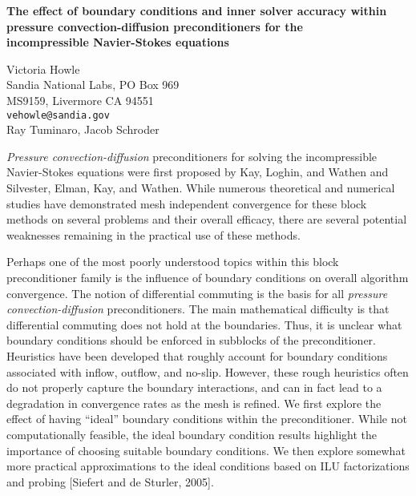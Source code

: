 \documentclass[twosided]{report}
\begin{document}
\begin{center}
{\large			%
{\bf The effect of boundary conditions and inner solver accuracy
within  \\ pressure convection-diffusion preconditioners for
the \\ incompressible Navier-Stokes equations}}

	Victoria Howle \\
	Sandia National Labs, PO Box 969 \\
	MS9159, Livermore CA 94551 \\
	{\tt vehowle@sandia.gov} \\
	Ray Tuminaro, Jacob Schroder
\end{center}
{\it Pressure convection-diffusion} preconditioners for
solving the incompressible Navier-Stokes equations were
first proposed by Kay, Loghin, and Wathen and Silvester,
Elman, Kay, and Wathen. While numerous theoretical and
numerical studies have demonstrated mesh independent
convergence for these block methods on several problems and
their overall efficacy, there are several potential
weaknesses remaining in the practical use of these methods.

Perhaps one of the most poorly understood topics within
this block preconditioner family is the influence of
boundary conditions on overall algorithm convergence. The
notion of differential commuting is the basis for all {\it
pressure convection-diffusion} preconditioners. The main
mathematical difficulty is that differential commuting does
not hold at the boundaries. Thus, it is unclear what
boundary conditions should be enforced in subblocks of the
preconditioner. Heuristics have been developed that roughly
account for boundary conditions associated with inflow,
outflow, and no-slip. However, these rough heuristics often
do not properly capture the boundary interactions, and can
in fact lead to a degradation in convergence rates as the
mesh is refined. We first explore the effect of having
``ideal'' boundary conditions within the preconditioner.
While not computationally feasible, the ideal boundary
condition results highlight the importance of choosing
suitable boundary conditions. We then explore somewhat more
practical approximations to the ideal conditions based on
ILU factorizations and probing [Siefert and de Sturler,
2005].
\end{document}
